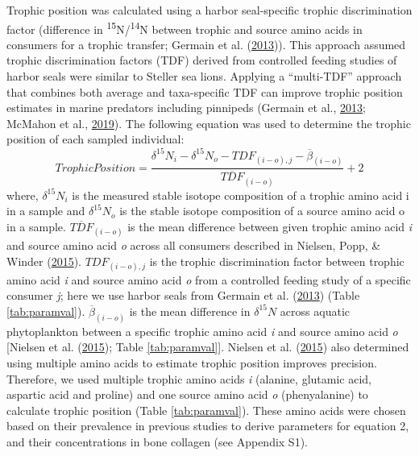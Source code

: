 \documentclass [11pt, proquest] {uwthesis}[2015/03/03]
\begin{document}
Trophic position was calculated using a harbor seal-specific trophic
discrimination factor (difference in
\textsuperscript{15}N/\textsuperscript{14}N between trophic and source
amino acids in consumers for a trophic transfer; Germain et al.
(\protect\hyperlink{ref-Germain2013}{2013})). This approach assumed
trophic discrimination factors (TDF) derived from controlled feeding
studies of harbor seals were similar to Steller sea lions. Applying a
``multi-TDF'' approach that combines both average and taxa-specific TDF
can improve trophic position estimates in marine predators including
pinnipeds (Germain et al., \protect\hyperlink{ref-Germain2013}{2013};
McMahon et al., \protect\hyperlink{ref-McMahon2019}{2019}). The
following equation was used to determine the trophic position of each
sampled individual:
\begin{equation} 
Trophic Position =   
  \frac{\delta^{15}N_i - \delta^{15}N_o - TDF_{(i-o),j} - \overline{\beta}_{(i-o)}}{\overline{TDF}_{(i-o)}}+2
  \label{eq:TP}
\end{equation}
where, \(\delta^{15}N_i\) is the measured stable isotope composition of
a trophic amino acid i in a sample and \(\delta^{15}N_o\) is the stable
isotope composition of a source amino acid o in a sample.
\(\overline{TDF}_{(i-o)}\) is the mean difference between given trophic
amino acid \emph{i} and source amino acid \emph{o} across all consumers
described in Nielsen, Popp, \& Winder
(\protect\hyperlink{ref-Nielsen2015}{2015}). \(TDF_{(i-o), j}\) is the
trophic discrimination factor between trophic amino acid \emph{i} and
source amino acid \emph{o} from a controlled feeding study of a specific
consumer \emph{j}; here we use harbor seals from Germain et al.
(\protect\hyperlink{ref-Germain2013}{2013}) (Table \ref{tab:paramval}).
\(\overline\beta_{(i-o)}\) is the mean difference in \(\delta^{15}N\)
across aquatic phytoplankton between a specific trophic amino acid
\emph{i} and source amino acid \emph{o} {[}Nielsen et al.
(\protect\hyperlink{ref-Nielsen2015}{2015}); Table
\ref{tab:paramval}{]}. Nielsen et al.
(\protect\hyperlink{ref-Nielsen2015}{2015}) also determined using
multiple amino acids to estimate trophic position improves precision.
Therefore, we used multiple trophic amino acids \emph{i} (alanine,
glutamic acid, aspartic acid and proline) and one source amino acid
\emph{o} (phenyalanine) to calculate trophic position (Table
\ref{tab:paramval}). These amino acids were chosen based on their
prevalence in previous studies to derive parameters for equation 2, and
their concentrations in bone collagen (see Appendix S1).
\end{document}
